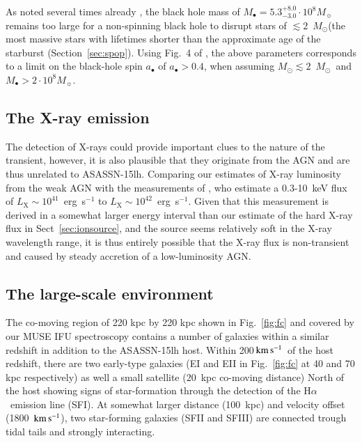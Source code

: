 \documentclass[traditabstract]{aa}
\newcommand{\kms}{$\rm{km\,s^{-1}}$}
\newcommand{\ha}{H$\alpha$}
\newcommand{\Msun}{$M_\odot$}
\begin{document}
As noted several times already \citep[e.g.][]{2015ATel.7776....1P, 2016Sci...351..257D, 2016NatAs...1E...2L}, the black hole mass of $M_\bullet = 5.3_{-3.0}^{+8.0}\cdot10^{8} M_\sun$ remains too large for a non-spinning black hole to disrupt stars of $\lesssim2$~\Msun (the most massive stars with lifetimes shorter than the approximate age of the starburst (Section~\ref{sec:spop}). Using Fig.~4 of \citet{2016NatAs...1E...2L}, the above parameters corresponds to a limit on the black-hole spin $a_\bullet$ of $a_\bullet > 0.4$, when assuming $M_\odot\lesssim2$~\Msun~and $M_\bullet > 2\cdot10^{8} M_\sun$.

\subsection{The X-ray emission}

The detection of X-rays \citep{2017ApJ...836...25M} could provide important clues to the nature of the transient, however, it is also plausible that they originate from the AGN and are thus unrelated to ASASSN-15lh. Comparing our estimates of X-ray luminosity from the weak AGN with the measurements of \citet{2017ApJ...836...25M}, who estimate a 0.3-10~keV flux of $L_{\mathrm{X}}\sim10^{41}$~erg~s$^{-1}$ to $L_{\mathrm{X}}\sim10^{42}$~erg~s$^{-1}$. Given that this measurement is derived in a somewhat larger energy interval than our estimate of the hard X-ray flux in Sect~\ref{sec:ionsource}, and the source seems relatively soft in the X-ray wavelength range, it is thus entirely possible that the X-ray flux is non-transient and caused by steady accretion of a low-luminosity AGN. 

\subsection{The large-scale environment}

The co-moving region of 220 kpc by 220 kpc shown in Fig.~\ref{fig:fc} and covered by our MUSE IFU spectroscopy contains a number of  galaxies within a similar redshift in addition to the ASASSN-15lh host. Within 200\,\kms~of the host redshift, there are two early-type galaxies (EI and EII in Fig.~\ref{fig:fc} at 40 and 70 kpc respectively) as well a small satellite (20~kpc co-moving distance) North of the host showing signs of star-formation through the detection of the \ha~emission line (SFI). At somewhat larger distance (100~kpc) and velocity offset (1800~\kms), two star-forming galaxies (SFII and SFIII) are connected trough tidal tails and strongly interacting.
\end{document}
